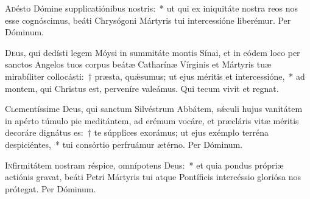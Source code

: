 \documentclass[vesperale_romanum]{subfiles}
\begin{document}

\oratio
\lettrine{A}{d}ésto Dómine supplicatiónibus nostris:~* ut qui ex iniquitáte nostra reos nos esse cognóscimus, beáti Chrysógoni Mártyris tui intercessióne liberémur.
Per Dóminum.

\capitdeseq
 
\myrule


\duplex

\oratio

\lettrine{D}{e}us, qui dedísti legem Móysi in summitáte montis Sínai, et in eódem loco per san\-ctos Angelos tuos corpus beátæ Catharínæ Vírginis et Mártyris tuæ mirabíliter collocásti:~† præsta, quǽsumus; ut ejus méritis et intercessióne,~* ad montem, qui Christus est, perveníre valeámus. Qui tecum vivit et regnat.

\myrule


\duplex

\oratio

\lettrine{C}{l}ementíssime Deus, qui sanctum Silvéstrum Abbátem, sǽculi hujus vanitátem in apérto túmulo pie meditántem, ad erémum vocáre, et præcláris vitæ méritis decoráre dignátus es:~† te súpplices exorámus; ut ejus exémplo terréna despiciéntes,~* tui consórtio perfruámur ætérno.
Per Dóminum.



\oratio

\lettrine{I}{n}firmitátem nostram réspice, omnípotens Deus:~* et quia pondus própriæ actiónis gravat, beáti Petri Mártyris tui atque Pontíficis intercéssio gloriósa nos prótegat.
Per Dóminum.
\end{document}
